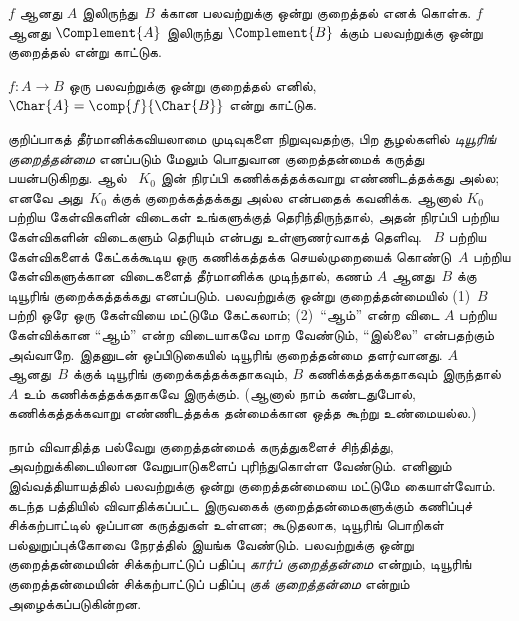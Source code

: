 \documentclass[../../../include/open-logic-section]{subfiles}
\begin{document}
\begin{prob}
$f$ ஆனது $A$ இலிருந்து~$B$ க்கான பலவற்றுக்கு ஒன்று குறைத்தல்
எனக் கொள்க. $f$ ஆனது $\Complement{A}$ இலிருந்து
$\Complement{B}$ க்கும் பலவற்றுக்கு ஒன்று குறைத்தல் என்று காட்டுக.
\end{prob}

\begin{prob}
$f\colon A \to B$ ஒரு பலவற்றுக்கு ஒன்று குறைத்தல் எனில்,
$\Char{A} = \comp{f}{\Char{B}}$ என்று காட்டுக.
\end{prob}

\begin{digress}
குறிப்பாகத் தீர்மானிக்கவியலாமை முடிவுகளை நிறுவுவதற்கு, பிற
சூழல்களில் \emph{டியூரிங் குறைத்தன்மை} எனப்படும் மேலும் பொதுவான
குறைத்தன்மைக் கருத்து பயன்படுகிறது.  ஆல்
~$K_0$ இன் நிரப்பி கணிக்கத்தக்கவாறு எண்ணிடத்தக்கது அல்ல;
எனவே அது~$K_0$ க்குக் குறைக்கத்தக்கது அல்ல என்பதைக் கவனிக்க.
ஆனால் $K_0$ பற்றிய கேள்விகளின் விடைகள் உங்களுக்குத் தெரிந்திருந்தால்,
அதன் நிரப்பி பற்றிய கேள்விகளின் விடைகளும் தெரியும் என்பது உள்ளுணர்வாகத்
தெளிவு. ~$B$ பற்றிய கேள்விகளைக் கேட்கக்கூடிய ஒரு கணிக்கத்தக்க
செயல்முறையைக் கொண்டு~$A$ பற்றிய கேள்விகளுக்கான விடைகளைத் தீர்மானிக்க
முடிந்தால், கணம் $A$ ஆனது~$B$ க்கு டியூரிங் குறைக்கத்தக்கது எனப்படும்.
பலவற்றுக்கு ஒன்று குறைத்தன்மையில் (1)~$B$ பற்றி ஒரே ஒரு கேள்வியை
மட்டுமே கேட்கலாம்; (2)~``ஆம்'' என்ற விடை $A$ பற்றிய கேள்விக்கான
``ஆம்'' என்ற விடையாகவே மாற வேண்டும், ``இல்லை'' என்பதற்கும் அவ்வாறே.
இதனுடன் ஒப்பிடுகையில் டியூரிங் குறைத்தன்மை தளர்வானது. $A$ ஆனது~$B$
க்குக் டியூரிங் குறைக்கத்தக்கதாகவும், $B$ கணிக்கத்தக்கதாகவும்
இருந்தால் $A$ உம் கணிக்கத்தக்கதாகவே இருக்கும். (ஆனால் நாம்
கண்டதுபோல், கணிக்கத்தக்கவாறு எண்ணிடத்தக்க தன்மைக்கான ஒத்த கூற்று
உண்மையல்ல.)

நாம் விவாதித்த பல்வேறு குறைத்தன்மைக் கருத்துகளைச் சிந்தித்து,
அவற்றுக்கிடையிலான வேறுபாடுகளைப் புரிந்துகொள்ள வேண்டும். எனினும்
இவ்வத்தியாயத்தில் பலவற்றுக்கு ஒன்று குறைத்தன்மையை மட்டுமே கையாள்வோம்.
கடந்த பத்தியில் விவாதிக்கப்பட்ட இருவகைக் குறைத்தன்மைகளுக்கும்
கணிப்புச் சிக்கற்பாட்டில் ஒப்பான கருத்துகள் உள்ளன; கூடுதலாக,
டியூரிங் பொறிகள் பல்லுறுப்புக்கோவை நேரத்தில் இயங்க வேண்டும்.
பலவற்றுக்கு ஒன்று குறைத்தன்மையின் சிக்கற்பாட்டுப் பதிப்பு
\emph{கார்ப் குறைத்தன்மை} என்றும், டியூரிங் குறைத்தன்மையின்
சிக்கற்பாட்டுப் பதிப்பு \emph{குக் குறைத்தன்மை} என்றும் அழைக்கப்படுகின்றன.
\end{digress}
\end{document}
